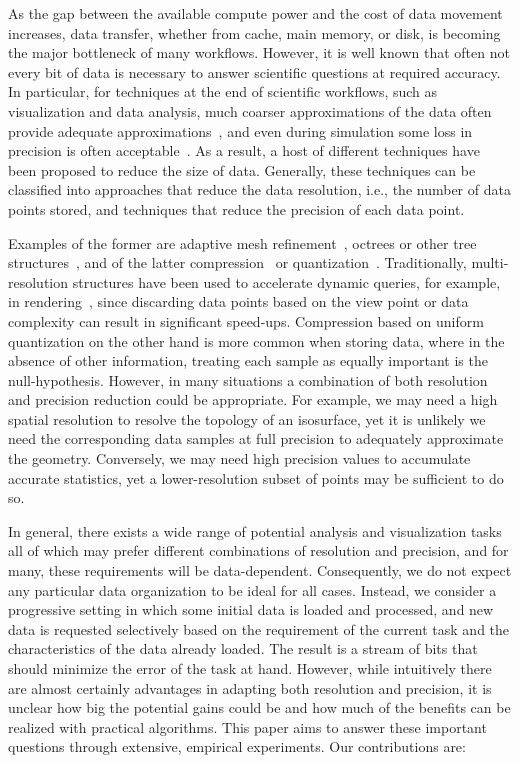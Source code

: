 As the gap between the available compute power and the cost of data movement increases, data
transfer, whether from cache, main memory, or disk, is becoming the major bottleneck of many
workflows. However, it is well known that often not every bit of data is necessary to answer
scientific questions at required accuracy. In particular, for techniques at the end of scientific
workflows, such as visualization and data analysis, much coarser approximations of the data often
provide adequate approximations~\cite{woodring2011,covra2012,compression_sim2013}, and even during
simulation some loss in precision is often acceptable~\cite{compression_sim2013}. As a result, a
host of different techniques have been proposed to reduce the size of data. Generally, these
techniques can be classified into approaches that reduce the data resolution, i.e., the number of
data points stored, and techniques that reduce the precision of each data point.

Examples of the former are adaptive mesh refinement~\cite{amr1989}, octrees or other tree
structures~\cite{hierarchical1984}, and of the latter compression~\cite{zfp2014} or
quantization~\cite{vq1992}. Traditionally, multi-resolution structures have been used to accelerate
dynamic queries, for example, in rendering~\cite{multires_octree1999}, since discarding data points
based on the view point or data complexity can result in significant speed-ups. Compression based on
uniform quantization on the other hand is more common when storing data, where in the absence of
other information, treating each sample as equally important is the null-hypothesis. However, in
many situations a combination of both resolution and precision reduction could be appropriate. For
example, we may need a high spatial resolution to resolve the topology of an isosurface, yet it is unlikely we
need the corresponding data samples at full precision to adequately approximate the
geometry. Conversely, we may need high precision values to accumulate accurate statistics, yet a
lower-resolution subset of points may be sufficient to do so. 

In general, there exists a wide range of potential analysis and visualization tasks all of which may
prefer different combinations of resolution and precision, and for many, these requirements will be
data-dependent. Consequently, we do not expect any particular data organization to be ideal for all
cases. Instead, we consider a progressive setting in which some initial data is loaded and processed,
and new data is requested selectively based on the requirement of the current task and the
characteristics of the data already loaded. The result is a stream of bits that should minimize
the error of the task at hand. However, while intuitively there are almost certainly advantages in
adapting both resolution and precision, it is unclear how big the potential gains could be and how
much of the benefits can be realized with practical algorithms. This paper aims to answer these
important questions through extensive, empirical experiments. Our contributions are:

